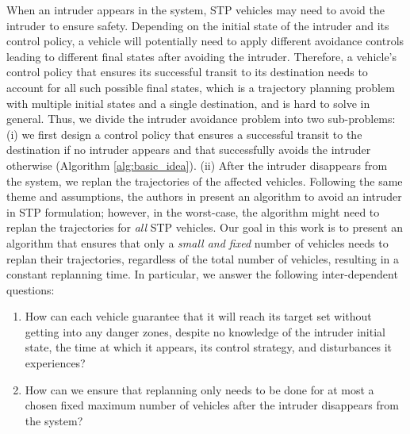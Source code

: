 When an intruder appears in the system, STP vehicles may need to avoid the intruder to ensure safety. Depending on the initial state of the intruder and its control policy, a vehicle will potentially need to apply different avoidance controls leading to different final states after avoiding the intruder. Therefore, a vehicle's control policy that ensures its successful transit to its destination needs to account for all such possible final states, which is a trajectory planning problem with multiple initial states and a single destination, and is hard to solve in general. Thus, we divide the intruder avoidance problem into two sub-problems: (i) we first design a control policy that ensures a successful transit to the destination if no intruder appears and that successfully avoids the intruder otherwise (Algorithm \ref{alg:basic_idea}). (ii) After the intruder disappears from the system, we replan the trajectories of the affected vehicles. Following the same theme and assumptions, the authors in \cite{Chen2016d} present an algorithm to avoid an intruder in STP formulation; however, in the worst-case, the algorithm might need to replan the trajectories for \textit{all} STP vehicles. Our goal in this work is to present an algorithm that ensures that only a \textit{small and fixed} number of vehicles needs to replan their trajectories, regardless of the total number of vehicles, resulting in a constant replanning time. In particular, we answer the following inter-dependent questions:
\begin{enumerate}
\item How can each vehicle guarantee that it will reach its target set without getting into any danger zones, despite no knowledge of the intruder initial state, the time at which it appears, its control strategy, and disturbances it experiences?
\item How can we ensure that replanning only needs to be done for at most a chosen fixed maximum number of vehicles after the intruder disappears from the system? \label{question2}
\end{enumerate}

